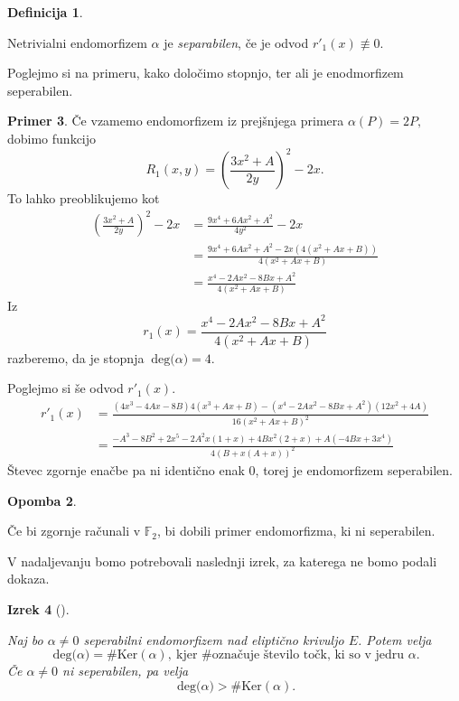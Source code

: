 \documentclass[12pt,a4paper,twoside]{article}
\theoremstyle{definition} %
\newtheorem{definicija}{Definicija}[section]
\newtheorem{primer}[definicija]{Primer}
\newtheorem{opomba}[definicija]{Opomba}
\theoremstyle{plain} %
\newtheorem{izrek}[definicija]{Izrek}
\numberwithin{equation}{section}  %
\newcommand{\F}{\mathbb F}
\newcommand{\DEG}[1]{\ \text{deg(}{#1}\text{)}}
\begin{document}
\begin{definicija}~

Netrivialni endomorfizem $\alpha$ je \emph{separabilen}, če je odvod $r'_1(x) \not \equiv 0$.
\end{definicija}

Poglejmo si na primeru, kako določimo stopnjo, ter ali je enodmorfizem seperabilen.

\begin{primer}
Če vzamemo endomorfizem iz prejšnjega primera $\alpha(P) = 2P,$ dobimo funkcijo
$$R_1(x,y) = \left(\frac{3x^2+A}{2y}\right)^2-2x.$$
To lahko preoblikujemo kot
\begin{align}
\left(\frac{3x^2+A}{2y}\right)^2-2x &{}= \frac{9x^4+6Ax^2+A^2}{4y^2}-2x \nonumber \\
&{} = \frac{9x^4+6Ax^2+A^2 - 2x(4(x^2+Ax+B))}{4(x^2+Ax+B)} \nonumber \\
&{} = \frac{x^4-2Ax^2-8Bx+A^2}{4(x^2+Ax+B)} \nonumber
\end{align}
Iz
$$r_1(x) = \frac{x^4-2Ax^2-8Bx+A^2}{4(x^2+Ax+B)}$$
razberemo, da je stopnja $\DEG{\alpha} = 4$.

Poglejmo si še odvod $r'_1(x)$.
\begin{align}
r'_1(x) &{}=\frac{(4x^3-4Ax-8B)4(x^3+Ax+B)-(x^4-2Ax^2-8Bx+A^2)(12x^2+4A)}{16(x^2+Ax+B)^2} \nonumber \\
&{} = \frac{-A^3 - 8 B^2 + 2 x^5 - 2 A^2 x (1 + x) + 4 B x^2 (2 + x) +  A (-4 B x + 3 x^4)}{4 (B + x (A + x))^2} \nonumber
\end{align}
Števec zgornje enačbe pa ni identično enak $0$, torej je endomorfizem seperabilen.
\begin{opomba}~

Če bi zgornje računali v $\F_2$, bi dobili primer endomorfizma, ki ni seperabilen.
\end{opomba}
\end{primer}

V nadaljevanju bomo potrebovali naslednji izrek, za katerega ne bomo podali dokaza.

\begin{izrek}[]~

\label{izrek:2.21}
Naj bo $\alpha \neq 0$ seperabilni endomorfizem nad eliptično krivuljo $E$. Potem velja
$$\DEG{\alpha}= \# \text{Ker}(\alpha), \ \text{kjer \# označuje število točk, ki so v jedru } \alpha.$$
Če $\alpha \neq 0$ ni seperabilen, pa velja
$$\DEG{\alpha} > \# \text{Ker}(\alpha).$$
\end{izrek}
\end{document}
